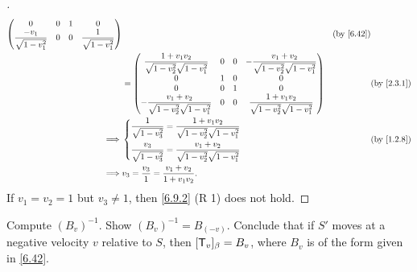 \begin{proof}[]
\begin{align*}
\begin{pmatrix}
                                 0                              & 0 & 1 & 0                              \\
                                 \dfrac{-v_1}{\sqrt{1 - v_1^2}} & 0 & 0 & \dfrac{1}{\sqrt{1 - v_1^2}}
                               \end{pmatrix}                                                               &  & \by{6.42}                                                             \\
             & = \begin{pmatrix}
                   \dfrac{1 + v_1 v_2}{\sqrt{1 - v_2^2} \sqrt{1 - v_1^2}} & 0 & 0 & -\dfrac{v_1 + v_2}{\sqrt{1 - v_2^2} \sqrt{1 - v_1^2}}  \\
                   0                                                      & 1 & 0 & 0                                                      \\
                   0                                                      & 0 & 1 & 0                                                      \\
                   -\dfrac{v_1 + v_2}{\sqrt{1 - v_2^2} \sqrt{1 - v_1^2}}  & 0 & 0 & \dfrac{1 + v_1 v_2}{\sqrt{1 - v_2^2} \sqrt{1 - v_1^2}}
                 \end{pmatrix} &  & \by{2.3.1}                  \\
    \implies & \begin{dcases}
                 \dfrac{1}{\sqrt{1 - v_3^2}} = \dfrac{1 + v_1 v_2}{\sqrt{1 - v_2^2} \sqrt{1 - v_1^2}} \\
                 \dfrac{v_3}{\sqrt{1 - v_3^2}} = \dfrac{v_1 + v_2}{\sqrt{1 - v_2^2} \sqrt{1 - v_1^2}}
               \end{dcases}                                           &  & \by{1.2.8}                                                              \\
    \implies & v_3 = \dfrac{v_3}{1} = \dfrac{v_1 + v_2}{1 + v_1 v_2}.
  \end{align*}
  If \(v_1 = v_2 = 1\) but \(v_3 \neq 1\), then \cref{6.9.2} (R 1) does not hold.
\end{proof}

\begin{ex}\label{ex:6.9.7}
  Compute \((B_v)^{-1}\).
  Show \((B_v)^{-1} = B_{(-v)}\).
  Conclude that if \(S'\) moves at a negative velocity \(v\) relative to \(S\), then \([\mathsf{T}_v]_{\beta} = B_v\), where \(B_v\) is of the form given in \cref{6.42}.
\end{ex}

